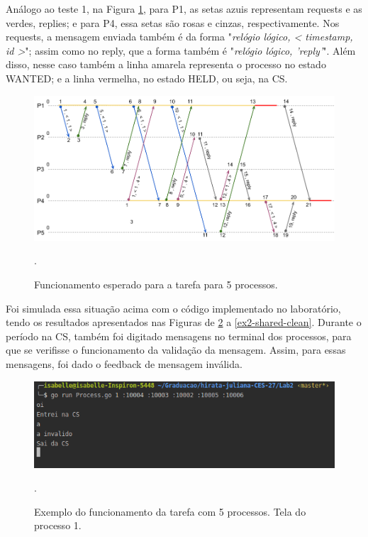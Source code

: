 \documentclass[conference]{IEEEtran}
\begin{document}
	Análogo ao teste 1, na Figura \ref{ex2}, para P1, as setas azuis representam requests e as verdes, replies; e para P4, essa setas são rosas e cinzas, respectivamente. Nos requests, a mensagem enviada também é da forma "\textit{relógio lógico, < timestamp, id >}"; assim como no reply, que a forma também é "\textit{relógio lógico, 'reply'}". Além disso, nesse caso também a linha amarela representa o processo no estado WANTED; e a linha vermelha, no estado HELD, ou seja, na CS.

\begin{figure}[H]
\centering
\centerline{\includegraphics[scale=0.25]{imagens/ex2.png}}
\caption{Funcionamento esperado para a tarefa para 5 processos.}.
\label{ex2}
\end{figure}

	Foi simulada essa situação acima com o código implementado no laboratório, tendo os resultados apresentados nas Figuras de \ref{ex2-proc1-clean} a \ref{ex2-shared-clean}. Durante o período na CS, também foi digitado mensagens no terminal dos processos, para que se verifisse o funcionamento da validação da mensagem. Assim, para essas mensagens, foi dado o feedback de mensagem inválida.

\begin{figure}[H]
\centering
\centerline{\includegraphics[scale=0.4]{imagens/ex2-proc1-clean.png}}
\caption{Exemplo do funcionamento da tarefa com 5 processos. Tela do processo 1.}.
\label{ex2-proc1-clean}
\end{figure}
\end{document}

